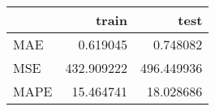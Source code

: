 \begin{tabular}{lrr}
\toprule
{} &       train &        test \\
\midrule
MAE  &    0.619045 &    0.748082 \\
MSE  &  432.909222 &  496.449936 \\
MAPE &   15.464741 &   18.028686 \\
\bottomrule
\end{tabular}
